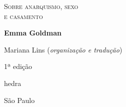 




\begingroup\thispagestyle{empty}\vspace*{.05\textheight} 

              \formular
              \LARGE
              \noindent
              \textsc{Sobre anarquismo, sexo\\ e casamento}
                      
              \bigskip  
              
              \Large
              \noindent
              \textbf{Emma Goldman}
              \vspace{2.5em}

              \newfontfamily{}
              {\fontsize{30}{40}\selectfont \minion\small\noindent Mariana Lins (\textit{organização e tradução})}\\
              \vspace{6em}

              \noindent
              {\fontsize{30}{40}\selectfont \minion\small\noindent 1ª edição}

              \vfill

              \newfontfamily{}
              {\fontsize{30}{40}\selectfont \timesnewroman hedra}
              \smallskip

              {\selectfont\minion\small
              São Paulo \quad\the\year}

\endgroup
\pagebreak
